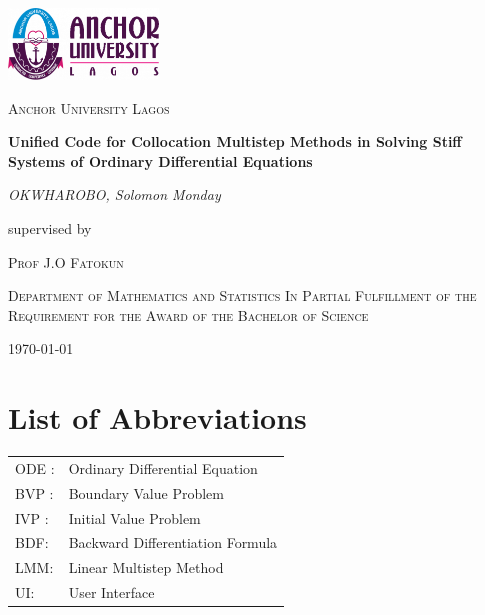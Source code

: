 \documentclass[12pt, a4paper, twoside]{report}
\begin{document}
\begin{titlepage}
   \centering
   \vspace*{1cm}
   \includegraphics[width=0.3\textwidth]{aul_logo.png}\par
   \vspace{1.5cm}
   {\scshape\LARGE Anchor University Lagos \par}
   \vspace{1cm}
   \vspace{1.5cm}
   {\huge\bfseries Unified Code for Collocation Multistep Methods in Solving Stiff Systems of Ordinary Differential Equations\par}
   \vspace{2cm}
   {\Large\itshape OKWHAROBO, Solomon Monday\par}
   \vfill
   supervised by\par
   \textsc{Prof J.O Fatokun}
   
   \textsc{Department of Mathematics and Statistics}
   \textsc{In Partial Fulfillment of the Requirement for the Award of the Bachelor of Science}

   \vfill

   {\large \today\par}
\end{titlepage}

\tableofcontents

\chapter*{List of Abbreviations}
\begin{tabular}{ll}
    ODE : & Ordinary Differential Equation \\
    BVP : & Boundary Value Problem \\
    IVP : & Initial Value Problem \\
    BDF: &Backward Differentiation Formula \\
    LMM: &Linear Multistep Method \\
    UI: &User Interface 
\end{tabular}












 
\end{document}

